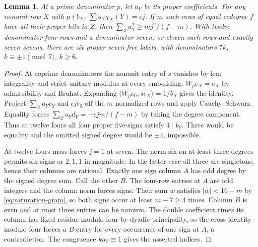 \documentclass[11pt]{amsart}
\numberwithin{equation}{section}
\newtheorem{lemma}[theorem]{Lemma}
\theoremstyle{definition}
\theoremstyle{plain}
\begin{document}
\begin{lemma}\label{result:cross-weyl}
At a prime denominator $p$, let $a_Y$ be its proper coefficients.
For any nonunit row $X$ with $p\nmid b_X$,
$\sum a_Y\chi_X(Y)=\epsilon j$. If $m$ such rows of equal codegree
$f$ have all their proper hits in $Z$, then
$\sum_Z a_Y^2\ge mj^2/(f-m)$. With twelve denominator-four rows
and a denominator seven, or eleven such rows and exactly seven sevens,
there are six proper seven-free labels, with denominators $7k$,
$k\equiv\pm1\pmod7$, $k\ge6$.
\end{lemma}
\begin{proof}
At coprime denominators the nonunit entry of $s$ vanishes by lcm
integrality and strict unitary modulus at every embedding.
$W_pe_X=e_X$ by admissibility and Bruhat. Expanding
$\langle W_pe_0,se_X\rangle=1/b_X$ gives the identity.
Project $\sum_Za_Ye_Y$ and $\epsilon j e_0$ off the $m$ normalized
rows and apply Cauchy--Schwarz. Equality forces
$\sum_Za_Yd_Y=-\epsilon jm/(f-m)$ by taking the degree component.
Thus at twelve fours all four proper five-signs satisfy $4\mid b_Y$.
Three would be equality and the omitted signed degree would be
$\pm4$, impossible.

At twelve fours mass forces $j=1$ at seven. The norm six on at
least three degrees permits six signs or $2,1,1$ in magnitude.
In the latter case all three are singletons, hence their columns
are rational. Exactly one sign column $A$ has odd degree by the
signed degree sum. Call the other $B$. The four-row entries at $A$
are odd integers and the column norm forces signs. Their sum $w$
satisfies $|w|<16-m$ by \eqref{eq:saturation-gram}, so both signs
occur at least $m-7\ge4$ times. Column $B$ is even and at most
three entries can be nonzero. The double coefficient times its
column has fixed residue modulo four by dyadic principality, so
the cross identity modulo four forces a $B$-entry for every occurrence
of one sign at $A$, a contradiction. The congruence $ka_Y\equiv1$
gives the asserted indices.
\end{proof}
\end{document}
